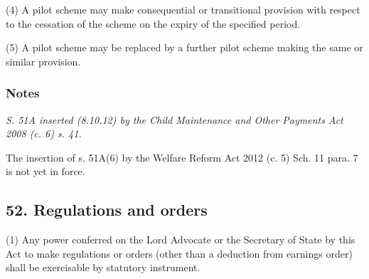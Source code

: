 \documentclass[a4paper]{article}
\newcommand\amendment[1]{\subsubsection*{Notes}{\itshape\frenchspacing\footnotesize #1 \par}}
\begin{document}
(4)
A pilot scheme may make consequential or transitional provision with respect to the cessation of the scheme on the expiry of the specified period.

(5)
A pilot scheme may be replaced by a further pilot scheme making the same or similar provision.

\amendment{
S. 51A inserted (8.10.12) by the Child Maintenance and Other Payments Act 2008 (c. 6) s. 41.

The insertion of s. 51A(6) by the Welfare Reform Act 2012 (c. 5) Sch. 11 para. 7 is not yet in force.
}

\subsection{52. Regulations and orders}

(1) Any power conferred on the Lord Advocate or the Secretary of State by this Act to make regulations or orders (other than a deduction from earnings order) shall be exercisable by statutory instrument.

\end{document}
